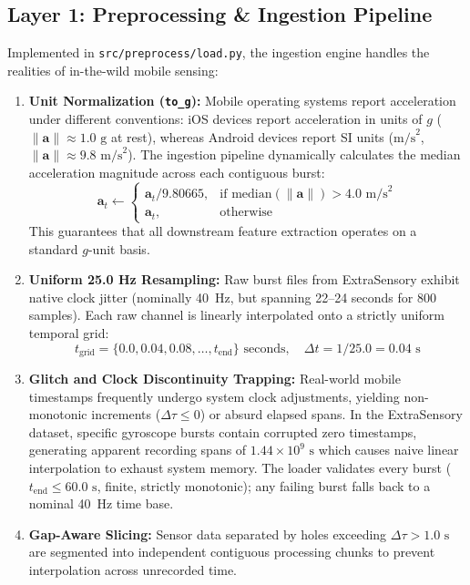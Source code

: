 \documentclass[11pt,a4paper]{article}
\begin{document}
\subsection{Layer 1: Preprocessing \& Ingestion Pipeline}
Implemented in \texttt{src/preprocess/load.py}, the ingestion engine handles the realities of in-the-wild mobile sensing:
\begin{enumerate}[leftmargin=1.5em,noitemsep,topsep=2pt]
  \item \textbf{Unit Normalization (\texttt{to\_g}):} Mobile operating systems report acceleration under different conventions: iOS devices report acceleration in units of $g$ ($\|\mathbf{a}\| \approx 1.0\text{ g}$ at rest), whereas Android devices report SI units ($\text{m/s}^2$, $\|\mathbf{a}\| \approx 9.8\text{ m/s}^2$). The ingestion pipeline dynamically calculates the median acceleration magnitude across each contiguous burst:
  \begin{equation}
    \mathbf{a}_t \leftarrow \begin{cases} \mathbf{a}_t / 9.80665, & \text{if } \text{median}(\|\mathbf{a}\|) > 4.0\text{ m/s}^2 \\ \mathbf{a}_t, & \text{otherwise} \end{cases}
  \end{equation}
  This guarantees that all downstream feature extraction operates on a standard $g$-unit basis.
  \item \textbf{Uniform 25.0 Hz Resampling:} Raw burst files from ExtraSensory exhibit native clock jitter (nominally 40~Hz, but spanning 22--24 seconds for 800 samples). Each raw channel is linearly interpolated onto a strictly uniform temporal grid:
  \begin{equation}
    t_{\text{grid}} = \{ 0.0, 0.04, 0.08, \dots, t_{\text{end}} \}\text{ seconds}, \quad \Delta t = 1/25.0 = 0.04\text{ s}
  \end{equation}
  \item \textbf{Glitch and Clock Discontinuity Trapping:} Real-world mobile timestamps frequently undergo system clock adjustments, yielding non-monotonic increments ($\Delta \tau \le 0$) or absurd elapsed spans. In the ExtraSensory dataset, specific gyroscope bursts contain corrupted zero timestamps, generating apparent recording spans of $1.44 \times 10^9\text{ s}$ which causes naive linear interpolation to exhaust system memory. The loader validates every burst ($t_{\text{end}} \le 60.0\text{ s}$, finite, strictly monotonic); any failing burst falls back to a nominal 40~Hz time base.
  \item \textbf{Gap-Aware Slicing:} Sensor data separated by holes exceeding $\Delta \tau > 1.0\text{ s}$ are segmented into independent contiguous processing chunks to prevent interpolation across unrecorded time.
\end{enumerate}
\end{document}
